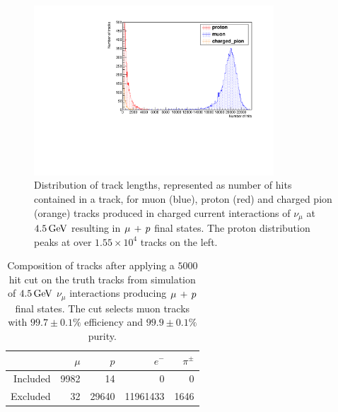 \begin{figure}
\centering
\includegraphics[angle=-90,width=0.8\textwidth]{chapters/particleid_images/ccqe-4500-track-lengths}
\caption[Track length distributions for $\mu$, $p$ and $\pi^+$ from $4.5\GeV$ neutrinos (CCQE)]{\label{fig:ccqe-track-lengths-4500MeV}Distribution of track lengths, represented as number of hits contained in a track, for muon (blue), proton (red) and charged pion (orange) tracks produced in charged current interactions of $\nu_\mu$ at $4.5\GeV$ resulting in $\mu\,+\,p$ final states. The proton distribution peaks at over $1.55\times10^4$ tracks on the left.}
\end{figure}

\begin{table}
\centering
\begin{tabular}{*{5}{r}}
 & $\mu$ & $p$ & $e^-$ & $\pi^\pm$ \\
\hline
\hline
Included & 9982 & 14 & 0 & 0 \\
Excluded & 32 & 29640 & 11961433 & 1646 \\
\hline
\end{tabular}
\caption[Composition of tracks after $5000$ hit cut on $4.5\GeV$ CCQE events]{\label{table:cut-results-ccqe-4.5}Composition of tracks after applying a $5000$ hit cut on the truth tracks from simulation of $4.5\GeV$ $\nu_\mu$ interactions producing $\mu\,+\,p$ final states. The cut selects muon tracks with $99.7\pm0.1\%$ efficiency and $99.9\pm0.1\%$ purity.}
\end{table}

